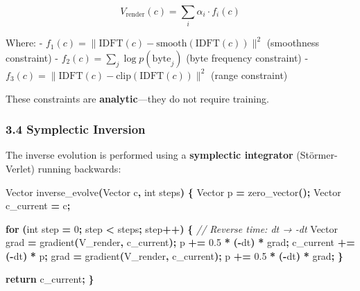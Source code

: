 \documentclass[
  11pt,
  a4paper,
]{article}
\newenvironment{Shaded}{\begin{snugshade}}{\end{snugshade}}
\newcommand{\CommentTok}[1]{\textcolor[rgb]{0.56,0.35,0.01}{\textit{#1}}}
\newcommand{\ControlFlowTok}[1]{\textcolor[rgb]{0.13,0.29,0.53}{\textbf{#1}}}
\newcommand{\DataTypeTok}[1]{\textcolor[rgb]{0.13,0.29,0.53}{#1}}
\newcommand{\DecValTok}[1]{\textcolor[rgb]{0.00,0.00,0.81}{#1}}
\newcommand{\FloatTok}[1]{\textcolor[rgb]{0.00,0.00,0.81}{#1}}
\newcommand{\NormalTok}[1]{#1}
\newcommand{\OperatorTok}[1]{\textcolor[rgb]{0.81,0.36,0.00}{\textbf{#1}}}
\begin{document}
\[
V_{\text{render}}(c) = \sum_i \alpha_i \cdot f_i(c)
\]

Where: -
\(f_1(c) = \|\text{IDFT}(c) - \text{smooth}(\text{IDFT}(c))\|^2\)
(smoothness constraint) - \(f_2(c) = \sum_j \log p(\text{byte}_j)\)
(byte frequency constraint) -
\(f_3(c) = \|\text{IDFT}(c) - \text{clip}(\text{IDFT}(c))\|^2\) (range
constraint)

These constraints are \textbf{analytic}---they do not require training.

\subsubsection{3.4 Symplectic Inversion}\label{symplectic-inversion}

The inverse evolution is performed using a \textbf{symplectic
integrator} (Störmer-Verlet) running backwards:

\begin{Shaded}
\begin{Highlighting}[]
\NormalTok{Vector inverse\_evolve}\OperatorTok{(}\NormalTok{Vector c}\OperatorTok{,} \DataTypeTok{int}\NormalTok{ steps}\OperatorTok{)} \OperatorTok{\{}
\NormalTok{    Vector p }\OperatorTok{=}\NormalTok{ zero\_vector}\OperatorTok{();}
\NormalTok{    Vector c\_current }\OperatorTok{=}\NormalTok{ c}\OperatorTok{;}
    
    \ControlFlowTok{for} \OperatorTok{(}\DataTypeTok{int}\NormalTok{ step }\OperatorTok{=} \DecValTok{0}\OperatorTok{;}\NormalTok{ step }\OperatorTok{\textless{}}\NormalTok{ steps}\OperatorTok{;}\NormalTok{ step}\OperatorTok{++)} \OperatorTok{\{}
        \CommentTok{// Reverse time: dt → {-}dt}
\NormalTok{        Vector grad }\OperatorTok{=}\NormalTok{ gradient}\OperatorTok{(}\NormalTok{V\_render}\OperatorTok{,}\NormalTok{ c\_current}\OperatorTok{);}
\NormalTok{        p }\OperatorTok{+=} \FloatTok{0.5} \OperatorTok{*} \OperatorTok{({-}}\NormalTok{dt}\OperatorTok{)} \OperatorTok{*}\NormalTok{ grad}\OperatorTok{;}
\NormalTok{        c\_current }\OperatorTok{+=} \OperatorTok{({-}}\NormalTok{dt}\OperatorTok{)} \OperatorTok{*}\NormalTok{ p}\OperatorTok{;}
\NormalTok{        grad }\OperatorTok{=}\NormalTok{ gradient}\OperatorTok{(}\NormalTok{V\_render}\OperatorTok{,}\NormalTok{ c\_current}\OperatorTok{);}
\NormalTok{        p }\OperatorTok{+=} \FloatTok{0.5} \OperatorTok{*} \OperatorTok{({-}}\NormalTok{dt}\OperatorTok{)} \OperatorTok{*}\NormalTok{ grad}\OperatorTok{;}
    \OperatorTok{\}}
    
    \ControlFlowTok{return}\NormalTok{ c\_current}\OperatorTok{;}
\OperatorTok{\}}
\end{Highlighting}
\end{Shaded}
\end{document}

